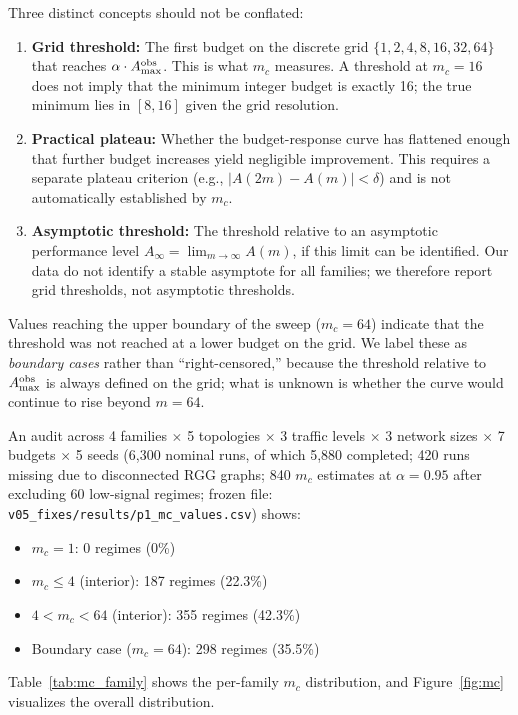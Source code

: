 \documentclass[quantumrep,article,submit,moreauthors]{Definitions/mdpi}
\begin{document}
Three distinct concepts should not be conflated:
\begin{enumerate}[leftmargin=2em]
\item \textbf{Grid threshold:} The first budget on the discrete grid $\{1,2,4,8,16,32,64\}$ that reaches $\alpha \cdot A_{\max}^{\rm obs}$. This is what $m_c$ measures. A threshold at $m_c = 16$ does not imply that the minimum integer budget is exactly 16; the true minimum lies in $[8, 16]$ given the grid resolution.
\item \textbf{Practical plateau:} Whether the budget-response curve has flattened enough that further budget increases yield negligible improvement. This requires a separate plateau criterion (e.g., $|A(2m) - A(m)| < \delta$) and is not automatically established by $m_c$.
\item \textbf{Asymptotic threshold:} The threshold relative to an asymptotic performance level $A_\infty = \lim_{m \to \infty} A(m)$, if this limit can be identified. Our data do not identify a stable asymptote for all families; we therefore report grid thresholds, not asymptotic thresholds.
\end{enumerate}

Values reaching the upper boundary of the sweep ($m_c = 64$) indicate that the threshold was not reached at a lower budget on the grid. We label these as \textit{boundary cases} rather than ``right-censored,'' because the threshold relative to $A_{\max}^{\rm obs}$ is always defined on the grid; what is unknown is whether the curve would continue to rise beyond $m = 64$.

An audit across 4 families $\times$ 5 topologies $\times$ 3 traffic levels $\times$ 3 network sizes $\times$ 7 budgets $\times$ 5 seeds (6{,}300 nominal runs, of which 5{,}880 completed; 420 runs missing due to disconnected RGG graphs; 840 $m_c$ estimates at $\alpha=0.95$ after excluding 60 low-signal regimes; frozen file: \texttt{v05\_fixes/results/p1\_mc\_values.csv}) shows:

\begin{itemize}[leftmargin=2em]
\item $m_c = 1$: 0 regimes (0\%)
\item $m_c \leq 4$ (interior): 187 regimes (22.3\%)
\item $4 < m_c < 64$ (interior): 355 regimes (42.3\%)
\item Boundary case ($m_c = 64$): 298 regimes (35.5\%)
\end{itemize}

Table~\ref{tab:mc_family} shows the per-family $m_c$ distribution, and Figure~\ref{fig:mc} visualizes the overall distribution.
\end{document}
